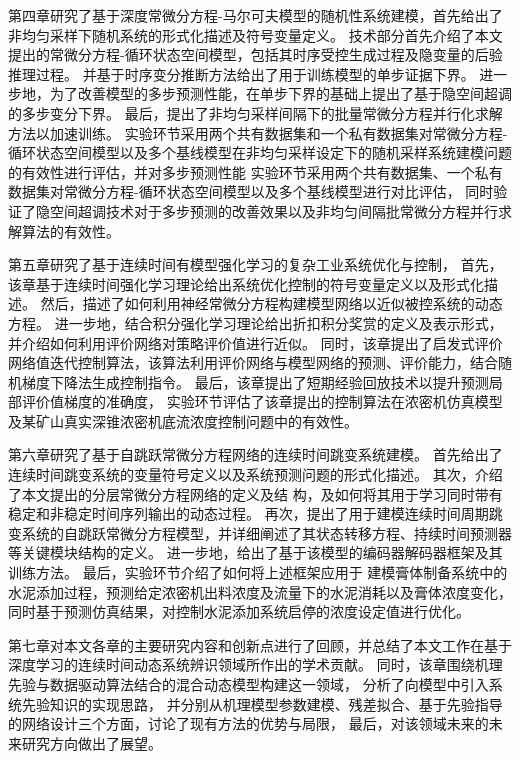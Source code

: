 第四章研究了基于深度常微分方程-马尔可夫模型的随机性系统建模，首先给出了非均匀采样下随机系统的形式化描述及符号变量定义。
技术部分首先介绍了本文提出的常微分方程-循环状态空间模型，包括其时序受控生成过程及隐变量的后验推理过程。
并基于时序变分推断方法给出了用于训练模型的单步证据下界。
进一步地，为了改善模型的多步预测性能，在单步下界的基础上提出了基于隐空间超调的多步变分下界。
最后，提出了非均匀采样间隔下的批量常微分方程并行化求解方法以加速训练。
实验环节采用两个共有数据集和一个私有数据集对常微分方程-循环状态空间模型以及多个基线模型在非均匀采样设定下的随机采样系统建模问题的有效性进行评估，并对多步预测性能
实验环节采用两个共有数据集、一个私有数据集对常微分方程-循环状态空间模型以及多个基线模型进行对比评估，
同时验证了隐空间超调技术对于多步预测的改善效果以及非均匀间隔批常微分方程并行求解算法的有效性。

第五章研究了基于连续时间有模型强化学习的复杂工业系统优化与控制，
首先，该章基于连续时间强化学习理论给出系统优化控制的符号变量定义以及形式化描述。
然后，描述了如何利用神经常微分方程构建模型网络以近似被控系统的动态方程。
进一步地，结合积分强化学习理论给出折扣积分奖赏的定义及表示形式，并介绍如何利用评价网络对策略评价值进行近似。
同时，该章提出了启发式评价网络值迭代控制算法，该算法利用评价网络与模型网络的预测、评价能力，结合随机梯度下降法生成控制指令。
最后，该章提出了短期经验回放技术以提升预测局部评价值梯度的准确度，
实验环节评估了该章提出的控制算法在浓密机仿真模型及某矿山真实深锥浓密机底流浓度控制问题中的有效性。

第六章研究了基于自跳跃常微分方程网络的连续时间跳变系统建模。
首先给出了连续时间跳变系统的变量符号定义以及系统预测问题的形式化描述。
其次，介绍了本文提出的分层常微分方程网络的定义及结
构，及如何将其用于学习同时带有稳定和非稳定时间序列输出的动态过程。
再次，提出了用于建模连续时间周期跳变系统的自跳跃常微分方程模型，并详细阐述了其状态转移方程、持续时间预测器等关键模块结构的定义。
进一步地，给出了基于该模型的编码器解码器框架及其训练方法。
最后，实验环节介绍了如何将上述框架应用于
建模膏体制备系统中的水泥添加过程，预测给定浓密机出料浓度及流量下的水泥消耗以及膏体浓度变化，
同时基于预测仿真结果，对控制水泥添加系统启停的浓度设定值进行优化。

第七章对本文各章的主要研究内容和创新点进行了回顾，并总结了本文工作在基于深度学习的连续时间动态系统辨识领域所作出的学术贡献。
同时，该章围绕机理先验与数据驱动算法结合的混合动态模型构建这一领域，
分析了向模型中引入系统先验知识的实现思路，
并分别从机理模型参数建模、残差拟合、基于先验指导的网络设计三个方面，讨论了现有方法的优势与局限，
最后，对该领域未来的未来研究方向做出了展望。
